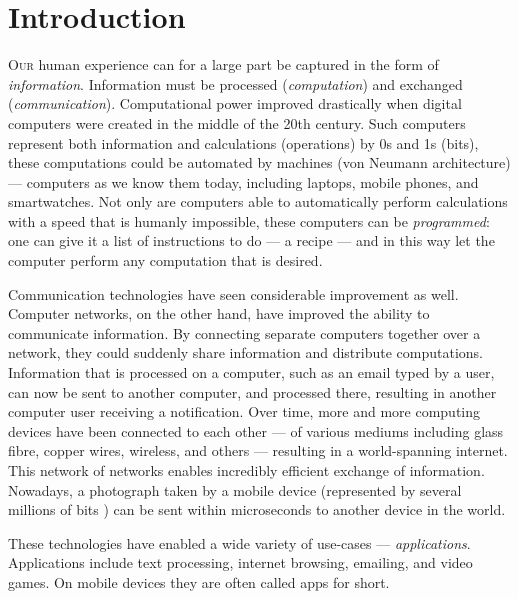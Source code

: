 \chapter{Introduction}
\label{chp:intro}

\lettrine{O}{ur} human experience can for a large part be captured in the form of \emph{information}.
Information must be processed (\emph{computation}) and exchanged (\emph{communication}).
Computational power improved drastically when digital computers were created in the middle of the 20th century.
Such computers represent both information and calculations (operations) by 0s and 1s (bits), these computations could be automated by machines (von Neumann architecture) --- computers as we know them today, including laptops, mobile phones, and smartwatches.
Not only are computers able to automatically perform calculations with a speed that is humanly impossible, these computers can be \textit{programmed}: one can give it a list of instructions to do --- a recipe --- and in this way let the computer perform any computation that is desired.


Communication technologies have seen considerable improvement as well.
Computer networks, on the other hand, have improved the ability to communicate information.
By connecting separate computers together over a network, they could suddenly share information and distribute computations.
Information that is processed on a computer, such as an email typed by a user, can now be sent to another computer, and processed there, resulting in another computer user receiving a notification.
Over time, more and more computing devices have been connected to each other --- of various mediums including glass fibre, copper wires, wireless, and others --- resulting in a world-spanning internet.
This network of networks enables incredibly efficient exchange of information.
Nowadays, a photograph taken by a mobile device (represented by several millions of bits ) can be sent within microseconds to another device in the world.

These technologies have enabled a wide variety of use-cases --- \emph{applications}.
Applications include text processing, internet browsing, emailing, and video games.
On mobile devices they are often called apps for short.


